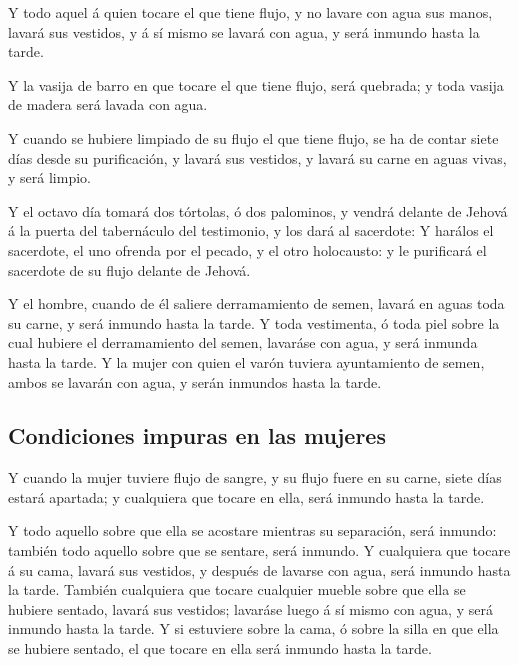  Y todo aquel á quien tocare el que tiene flujo, y no
lavare con agua sus manos, lavará sus vestidos, y á sí mismo se lavará
con agua, y será inmundo hasta la tarde.

 Y la vasija de barro en que tocare el que tiene flujo,
será quebrada; y toda vasija de madera será lavada con agua.

 Y cuando se hubiere limpiado de su flujo el que tiene
flujo, se ha de contar siete días desde su purificación, y lavará sus
vestidos, y lavará su carne en aguas vivas, y será limpio.

 Y el octavo día tomará dos tórtolas, ó dos palominos, y
vendrá delante de Jehová á la puerta del tabernáculo del testimonio, y
los dará al sacerdote:  Y harálos el sacerdote, el uno
ofrenda por el pecado, y el otro holocausto: y le purificará el
sacerdote de su flujo delante de Jehová.

 Y el hombre, cuando de él saliere derramamiento de semen,
lavará en aguas toda su carne, y será inmundo hasta la tarde.
 Y toda vestimenta, ó toda piel sobre la cual hubiere el
derramamiento del semen, lavaráse con agua, y será inmunda hasta la
tarde.  Y la mujer con quien el varón tuviera ayuntamiento
de semen, ambos se lavarán con agua, y serán inmundos hasta la tarde.

\hypertarget{condiciones-impuras-en-las-mujeres}{%
\subsection{Condiciones impuras en las
mujeres}\label{condiciones-impuras-en-las-mujeres}}

 Y cuando la mujer tuviere flujo de sangre, y su flujo
fuere en su carne, siete días estará apartada; y cualquiera que tocare
en ella, será inmundo hasta la tarde.

 Y todo aquello sobre que ella se acostare mientras su
separación, será inmundo: también todo aquello sobre que se sentare,
será inmundo.  Y cualquiera que tocare á su cama, lavará
sus vestidos, y después de lavarse con agua, será inmundo hasta la
tarde.  También cualquiera que tocare cualquier mueble
sobre que ella se hubiere sentado, lavará sus vestidos; lavaráse luego á
sí mismo con agua, y será inmundo hasta la tarde.  Y si
estuviere sobre la cama, ó sobre la silla en que ella se hubiere
sentado, el que tocare en ella será inmundo hasta la tarde.


